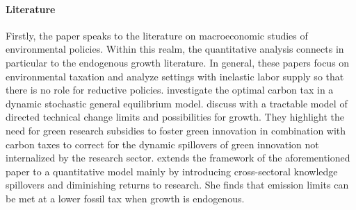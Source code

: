 \paragraph{Literature}

 


Firstly, the paper speaks to the literature on macroeconomic studies of environmental policies. Within this realm, the quantitative analysis connects in particular to the endogenous growth literature. 
In general, these papers focus on environmental taxation and analyze settings with inelastic labor supply so that there is no role for reductive policies. \cite{Golosov2014OptimalEquilibrium} investigate the optimal carbon tax in a dynamic stochastic general equilibrium model.  
\cite{Acemoglu2012TheChange} discuss with a tractable model of directed technical change limits and possibilities for growth. They highlight the need for green research subsidies to foster green innovation in combination with carbon taxes to correct for the dynamic spillovers of green innovation not internalized by the research sector.
\cite{Fried2018ClimateAnalysis} extends the framework of the aforementioned paper to a quantitative model mainly by introducing cross-sectoral knowledge spillovers and diminishing returns to research. She finds that emission limits can be met at a lower fossil tax when growth is endogenous. 


